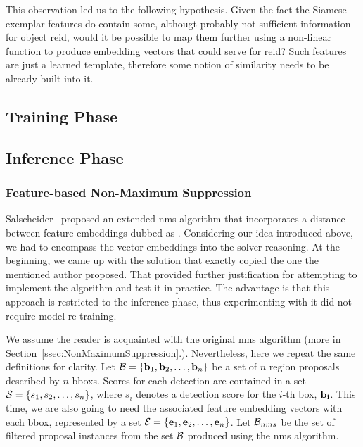 This observation led us to the following hypothesis. Given the fact the Siamese exemplar features do contain some, althougt probably not sufficient information for object \gls{reid}, would it be possible to map them further using a non-linear function to produce embedding vectors that could serve for \gls{reid}? Such features are just a learned template, therefore some notion of similarity needs to be already built into it.

\subsection{Training Phase}

\subsection{Inference Phase}

\subsubsection{Feature-based Non-Maximum Suppression}
\label{sssec:FeatureNonMaximumSuppression}

Salscheider~\cite{salscheider2020featurenms} proposed an extended \gls{nms} algorithm that incorporates a distance between feature embeddings dubbed as \featurenms{}. Considering our idea introduced above, we had to encompass the vector embeddings into the solver reasoning. At the beginning, we came up with the solution that exactly copied the one the mentioned author proposed. That provided further justification for attempting to implement the algorithm and test it in practice. The advantage is that this approach is restricted to the inference phase, thus experimenting with it did not require model re-training.

We assume the reader is acquainted with the original \gls{nms} algorithm (more in Section~\ref{ssec:NonMaximumSuppression}.). Nevertheless, here we repeat the same definitions for clarity. Let $\mathcal{B} = \left\{ {\mathbf{b}_1, \mathbf{b}_2, \dots, \mathbf{b}_n} \right\}$ be a set of $n$ region proposals described by $n$ \glspl{bbox}. Scores for each detection are contained in a set $\mathcal{S} = \left\{ {s_1, s_2, \dots, s_n} \right\}$, where $s_i$ denotes a detection score for the $i$-th box, $\mathbf{b_i}$. This time, we are also going to need the associated feature embedding vectors with each \gls{bbox}, represented by a set $\mathcal{E} = \left\{ {\mathbf{e}_1, \mathbf{e}_2, \dots, \mathbf{e}_n} \right\}$. Let $\mathcal{B}_{nms}$ be  the set of filtered proposal instances from the set $\mathcal{B}$ produced using the \gls{nms} algorithm.

